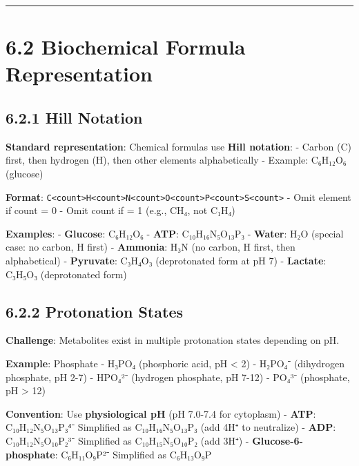 \begin{center}\rule{0.5\linewidth}{0.5pt}\end{center}

\hypertarget{biochemical-formula-representation}{%
\section{6.2 Biochemical Formula
Representation}\label{biochemical-formula-representation}}

\hypertarget{hill-notation}{%
\subsection{6.2.1 Hill Notation}\label{hill-notation}}

\textbf{Standard representation}: Chemical formulas use \textbf{Hill
notation}: - Carbon (C) first, then hydrogen (H), then other elements
alphabetically - Example: C₆H₁₂O₆ (glucose)

\textbf{Format}:
\passthrough{\lstinline!C<count>H<count>N<count>O<count>P<count>S<count>!}
- Omit element if count = 0 - Omit count if = 1 (e.g., CH₄, not C₁H₄)

\textbf{Examples}: - \textbf{Glucose}: C₆H₁₂O₆ - \textbf{ATP}:
C₁₀H₁₆N₅O₁₃P₃ - \textbf{Water}: H₂O (special case: no carbon, H first) -
\textbf{Ammonia}: H₃N (no carbon, H first, then alphabetical) -
\textbf{Pyruvate}: C₃H₄O₃ (deprotonated form at pH 7) -
\textbf{Lactate}: C₃H₅O₃ (deprotonated form)

\hypertarget{protonation-states}{%
\subsection{6.2.2 Protonation States}\label{protonation-states}}

\textbf{Challenge}: Metabolites exist in multiple protonation states
depending on pH.

\textbf{Example}: Phosphate - H₃PO₄ (phosphoric acid, pH \textless{} 2)
- H₂PO₄⁻ (dihydrogen phosphate, pH 2-7) - HPO₄²⁻ (hydrogen phosphate, pH
7-12) - PO₄³⁻ (phosphate, pH \textgreater{} 12)

\textbf{Convention}: Use \textbf{physiological pH} (pH 7.0-7.4 for
cytoplasm) - \textbf{ATP}: C₁₀H₁₂N₅O₁₃P₃⁴⁻ \textrightarrow Simplified as C₁₀H₁₆N₅O₁₃P₃
(add 4H⁺ to neutralize) - \textbf{ADP}: C₁₀H₁₂N₅O₁₀P₂³⁻ \textrightarrow Simplified as
C₁₀H₁₅N₅O₁₀P₂ (add 3H⁺) - \textbf{Glucose-6-phosphate}: C₆H₁₁O₉P²⁻ \textrightarrow
Simplified as C₆H₁₃O₉P

